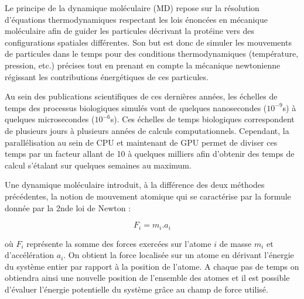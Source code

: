 
Le principe de la dynamique moléculaire (MD) repose sur la résolution d'équations thermodynamiques respectant les lois énoncées en mécanique moléculaire afin de guider les particules décrivant la protéine vers des configurations spatiales différentes. Son but est donc de simuler les mouvements de particules dans le temps pour des conditions thermodynamiques (température, pression, etc.) précises tout en prenant en compte la mécanique newtonienne régissant les contributions énergétiques de ces particules.

Au sein des publications scientifiques de ces dernières années, les échelles de temps des processus biologiques simulés vont de quelques nanosecondes ($10^{-9}$s) à quelques microsecondes ($10^{-6}$s). Ces échelles de temps biologiques correspondent de plusieurs jours à plusieurs années de calculs computationnels. Cependant, la parallélisation au sein de CPU et maintenant de GPU permet de diviser ces temps par un facteur allant de 10 à quelques milliers afin d'obtenir des temps de calcul s'étalant sur quelques semaines au maximum.

Une dynamique moléculaire introduit, à la différence des deux méthodes précédentes, la notion de mouvement atomique qui se caractérise par la formule donnée par la 2nde loi de Newton :

$$F_i = m_i.a_i$$

où $F_i$ représente la somme des forces exercées sur l'atome $i$ de masse $m_i$ et d'accélération $a_i$. On obtient la force localisée sur un atome en dérivant l'énergie du système entier par rapport à la position de l'atome. A chaque pas de temps on obtiendra ainsi une nouvelle position de l'ensemble des atomes et il est possible d'évaluer l'énergie potentielle du système grâce au champ de force utilisé.

